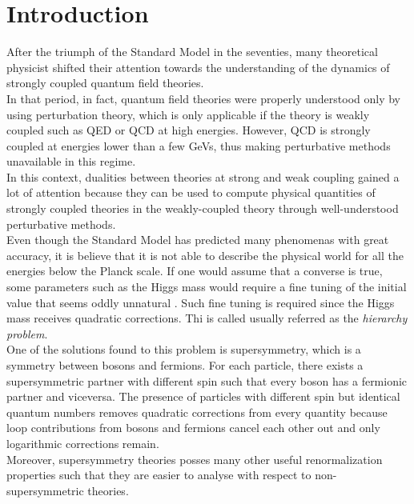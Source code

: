 \cleardoublepage
\chapter{Introduction}
After the triumph of the Standard Model in the seventies, many theoretical physicist shifted their attention towards the understanding of the dynamics of strongly coupled quantum field theories. \\
In that period, in fact, quantum field theories were properly understood only by using perturbation theory, which is only applicable if the theory is weakly coupled such as QED or QCD at high energies.
However, QCD is strongly coupled at energies lower than a few GeVs, thus making perturbative methods unavailable in this regime.
\\
In this context, dualities between theories at strong and weak coupling gained a lot of attention because they can be used to compute physical quantities of strongly coupled theories in the weakly-coupled theory through well-understood perturbative methods.
\\

Even though the Standard Model has predicted many phenomenas with great accuracy, it is believe that it is not able to describe the physical world for all the energies below the Planck scale.
If one would assume that a converse is true, some parameters such as the Higgs mass would require a fine tuning of the initial value that
seems oddly unnatural .
Such fine tuning is required since the Higgs mass receives quadratic corrections.
Thi is called usually referred as the \emph{hierarchy problem}.
\\
One of the solutions found to this problem is supersymmetry, which is a symmetry between bosons and fermions. 
For each particle, there exists a supersymmetric partner with different spin  such that every boson has a fermionic partner and viceversa.
The presence of particles with different spin but identical quantum numbers removes quadratic corrections from every quantity because loop contributions from bosons and fermions cancel each other out and only logarithmic corrections remain.
\\
Moreover, supersymmetry theories posses many other useful renormalization properties such that they are easier to analyse with respect to non-supersymmetric theories.\\


